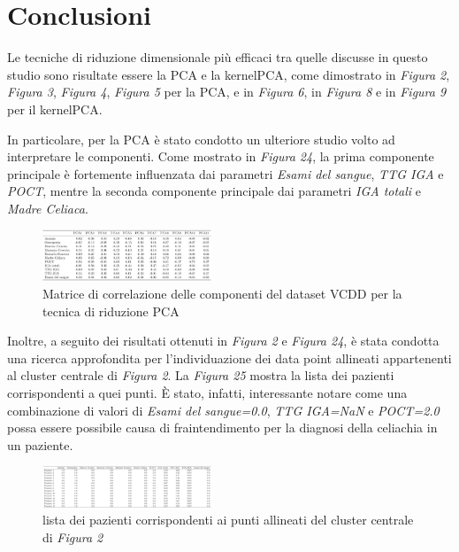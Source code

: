\documentclass[11pt,a4paper,twocolumn]{article}
\begin{document}
\section{Conclusioni}
Le tecniche di riduzione dimensionale più efficaci tra quelle discusse in questo studio sono risultate essere la PCA e la kernelPCA, come dimostrato in \emph{Figura 2}, \emph{Figura 3}, \emph{Figura 4}, \emph{Figura 5} per la PCA, e in \emph{Figura 6}, in \emph{Figura 8} e in \emph{Figura 9} per il kernelPCA. \par

In particolare, per la PCA è stato condotto un ulteriore studio volto ad interpretare le componenti. Come mostrato in \emph{Figura 24}, la prima componente principale è fortemente influenzata dai parametri \emph{Esami del sangue}, \emph{TTG IGA} e \emph{POCT}, mentre la seconda componente principale dai parametri \emph{IGA totali} e \emph{Madre Celiaca}.

\begin{figure}[H]
	\centering
	\includegraphics[width=0.45\textwidth]{img/PCA_components_interpretation.png}
	\caption{Matrice di correlazione delle componenti del dataset VCDD per la tecnica di riduzione PCA}
\end{figure}

Inoltre, a seguito dei risultati ottenuti in \emph{Figura 2} e \emph{Figura 24}, è stata condotta una ricerca approfondita per l'individuazione dei data point allineati appartenenti al cluster centrale di \emph{Figura 2}. La \emph{Figura 25} mostra la lista dei pazienti corrispondenti a quei punti. È stato, infatti, interessante notare come una combinazione di valori di \emph{Esami del sangue=0.0}, \emph{TTG IGA=NaN} e \emph{POCT=2.0} possa essere possibile causa di fraintendimento per la diagnosi della celiachia in un paziente.

\begin{figure}[h]
	\centering
	\includegraphics[width=0.45\textwidth]{img/pazientiFiltrati.png}
	\caption{lista dei pazienti corrispondenti ai punti allineati del cluster centrale di \emph{Figura 2}}
\end{figure}
\end{document}
